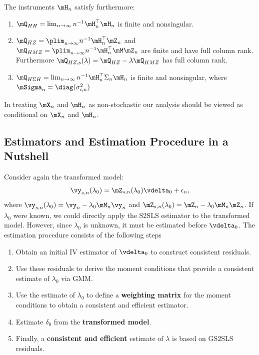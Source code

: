 \documentclass[english,12pt]{book}\usepackage[]{graphicx}\usepackage[]{xcolor}
\begin{document}
\begin{assumption}\label{assumption:instruments-arraiz} 
The instruments $\mH_n$ satisfy furthermore:
\begin{enumerate}
\item $\mQ_{HH} = \lim_{n \to \infty}n^{-1}\mH_n^\top\mH_n$ is finite and nonsingular.
\item $\mQ_{HZ} = \plim_{n \to \infty}n^{-1}\mH_n^\top\mZ_n$ and $\mQ_{HMZ} = \plim_{n \to \infty}n^{-1}\mH_n^\top\mM\mZ_n$ are finite and have full column rank. Furthermore $\mQ_{HZ,s}(\lambda) = \mQ_{HZ}-\lambda \mQ_{HMZ}$ has full column rank.
\item $\mQ_{H\Sigma H} = \lim_{n \to \infty}n^{-1}\mH_n^\top\Sigma_n\mH_n$ is finite and nonsingular, where $\mSigma_n= \diag(\sigma^2_{i,n})$
\end{enumerate}
\end{assumption}

In treating $\mX_n$ and $\mH_n$ as non-stochastic our analysis should be viewed as conditional on $\mX_n$ and $\mH_n$.


\subsection{Estimators and Estimation Procedure in a Nutshell}

Consider again the transformed model:
\begin{equation*}
  \vy_{s,n}(\lambda_0) = \mZ_{s,n}(\lambda_0)\vdelta_0 + \epsilon_n, 
\end{equation*}
%
where $\vy_{s,n}(\lambda_0) = \vy_n - \lambda_0\mM_n\vy_n$ and $\mZ_{s,n}(\lambda_0) = \mZ_n - \lambda_0\mM_n\mZ_n$. If $\lambda_0$ were known, we could directly apply the S2SLS estimator to the transformed model. However,  since $\lambda_0$ is unknown, it must be estimated before $\vdelta_0$. The estimation procedure consists of the following steps

\begin{enumerate}
  \item Obtain an initial IV estimator of $\vdelta_0$ to construct consistent residuals.
  \item Use these residuals to derive the moment conditions that provide a consistent estimate  of $\lambda_0$ via GMM.
  \item Use the estimate of $\lambda_0$ to define a \textbf{weighting matrix} for the moment conditions to obtain a consistent and efficient estimator. 
  \item Estimate $\delta_0$ from the \textbf{transformed model}.
  \item Finally, a \textbf{consistent and efficient} estimate of $\lambda$ is based on GS2SLS residuals. 
\end{enumerate}
\end{document}
